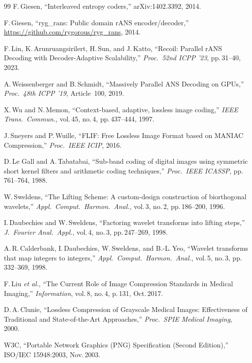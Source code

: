 \documentclass[journal]{IEEEtran}
\begin{document}
\begin{thebibliography}{99}
F.\,Giesen, ``Interleaved entropy coders,'' arXiv:1402.3392, 2014.

F.\,Giesen, ``ryg\_rans: Public domain rANS encoder/decoder,''
\url{https://github.com/rygorous/ryg_rans}, 2014.

F.\,Lin, K.\,Arunruangsirilert, H.\,Sun, and J.\,Katto,
``Recoil: Parallel rANS Decoding with Decoder-Adaptive Scalability,''
\textit{Proc.\ 52nd ICPP '23}, pp.\,31--40, 2023.

A.\,Weissenberger and B.\,Schmidt,
``Massively Parallel ANS Decoding on GPUs,''
\textit{Proc.\ 48th ICPP '19}, Article~100, 2019.

X.\,Wu and N.\,Memon,
``Context-based, adaptive, lossless image coding,''
\textit{IEEE Trans.\ Commun.}, vol.\,45, no.\,4, pp.\,437--444, 1997.

J.\,Sneyers and P.\,Wuille,
``FLIF: Free Lossless Image Format based on MANIAC Compression,''
\textit{Proc.\ IEEE ICIP}, 2016.

D.\,Le Gall and A.\,Tabatabai,
``Sub-band coding of digital images using symmetric short kernel filters and
arithmetic coding techniques,'' \textit{Proc.\ IEEE ICASSP}, pp.\,761--764,
1988.

W.\,Sweldens,
``The Lifting Scheme: A custom-design construction of biorthogonal wavelets,''
\textit{Appl.\ Comput.\ Harmon.\ Anal.}, vol.\,3, no.\,2, pp.\,186--200, 1996.

I.\,Daubechies and W.\,Sweldens,
``Factoring wavelet transforms into lifting steps,''
\textit{J.\ Fourier Anal.\ Appl.}, vol.\,4, no.\,3, pp.\,247--269, 1998.

A.\,R.\,Calderbank, I.\,Daubechies, W.\,Sweldens, and B.-L.\,Yeo,
``Wavelet transforms that map integers to integers,''
\textit{Appl.\ Comput.\ Harmon.\ Anal.}, vol.\,5, no.\,3, pp.\,332--369, 1998.


F.\,Liu \textit{et al.},
``The Current Role of Image Compression Standards in Medical Imaging,''
\textit{Information}, vol.\,8, no.\,4, p.\,131, Oct.\,2017.

D.\,A.\,Clunie,
``Lossless Compression of Grayscale Medical Images: Effectiveness of
Traditional and State-of-the-Art Approaches,''
\textit{Proc.\ SPIE Medical Imaging}, 2000.

W3C, ``Portable Network Graphics (PNG) Specification (Second Edition),''
ISO/IEC 15948:2003, Nov.\,2003.


\end{thebibliography}
\end{document}
